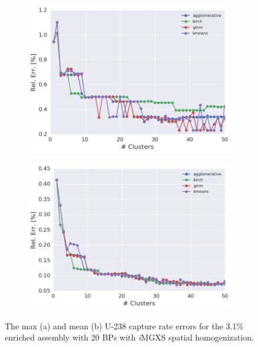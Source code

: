 \begin{figure}[h!]
\centering
\begin{subfigure}{0.9\textwidth}
  \centering
  \includegraphics[width=\linewidth]{figures/results/err-by-cluster/assm-31-20BPs/max-rel-err}
  \caption{}
  \label{fig:chap11-max-capt-err-by-cluster-assm-31-20BPs}
\end{subfigure}
\begin{subfigure}{0.9\textwidth}
  \centering
  \includegraphics[width=\linewidth]{figures/results/err-by-cluster/assm-31-20BPs/mean-rel-err}
  \caption{}
  \label{fig:chap11-mean-capt-err-by-cluster-assm-31-20BPs}
\end{subfigure}
\caption[U-238 capture rate error variation with the number of clusters]{The max (a) and mean (b) U-238 capture rate errors for the 3.1\% enriched assembly with 20 \acp{BP} with \textit{i}\ac{MGXS} spatial homogenization.}
\label{fig:chap11-capt-err-by-cluster-assm-31-20BPs}
\end{figure}

